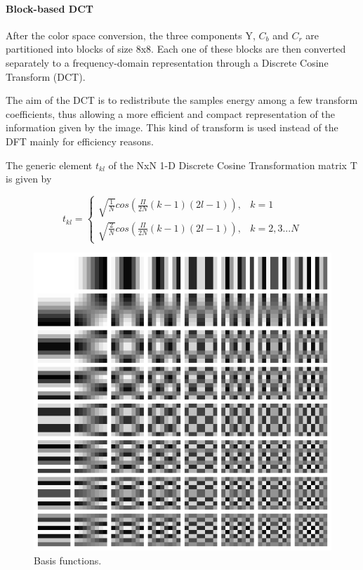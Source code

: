 \documentclass[14pt,a4paper]{extarticle}
\begin{document}
\paragraph{Block-based DCT}
After the color space conversion, the three components Y, $C_b$ and $C_r$ are partitioned into blocks of size 8x8. Each one of these blocks are then converted separately to a frequency-domain representation through a Discrete Cosine Transform (DCT).

The aim of the DCT is to redistribute the samples energy among a few transform coefficients, thus allowing a more efficient and compact representation of the information given by the image. This kind of transform is used instead of the DFT mainly for efficiency reasons.

The generic element $t_{kl}$ of the NxN 1-D Discrete Cosine Transformation matrix T is given by

\begin{equation}
t_{kl} = 
\begin{cases}
\sqrt{\frac{1}{N}} cos (\frac{\Pi}{2N}(k - 1)(2l - 1)), & k = 1 \\ 
\sqrt{\frac{2}{N}} cos (\frac{\Pi}{2N}(k - 1)(2l - 1)), & k = 2, 3 ... N
\end{cases}
\end{equation}
\begin{figure}
\includegraphics[width=0.95\linewidth, center]{pics/dct.png} 
\caption{Basis functions.}
\label{fig:dct}
\end{figure}
\end{document}
